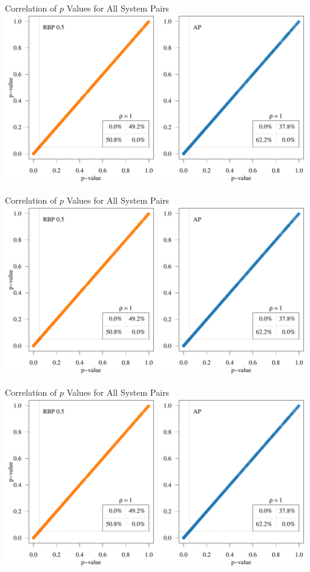 \documentclass{beamer}
\begin{document}
\begin{frame}{Correlation of $p$ Values for All System Pairs}
\includegraphics[width=0.98\textwidth, page=5]{figs/p_scatter_for_talk.pdf}
\end{frame}

\begin{frame}{Correlation of $p$ Values for All System Pairs}
\includegraphics[width=0.98\textwidth, page=6]{figs/p_scatter_for_talk.pdf}
\end{frame}

\begin{frame}{Correlation of $p$ Values for All System Pairs}
\includegraphics[width=0.98\textwidth, page=7]{figs/p_scatter_for_talk.pdf}
\end{frame}
\end{document}
